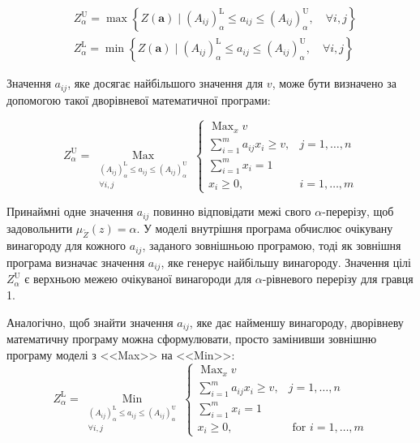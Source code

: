 \documentclass[14pt, a4paper, oneside]{extarticle}
\numberwithin{equation}{section}
\begin{document}
\begin{equation}
\begin{aligned}
& Z_{\alpha}^{\mathrm{U}}=\max \left\{Z(\mathbf{a}) \mid\left(A_{i j}\right)_{\alpha}^{\mathrm{L}} \leq a_{i j} \leq\left(A_{i j}\right)_{\alpha}^{\mathrm{U}}, \quad \forall i, j\right\} \\
& Z_{\alpha}^{\mathrm{L}}=\min \left\{Z(\mathbf{a}) \mid\left(A_{i j}\right)_{\alpha}^{\mathrm{L}} \leq a_{i j} \leq\left(A_{i j}\right)_{\alpha}^{\mathrm{U}}, \quad \forall i, j\right\}
\end{aligned}
\end{equation}

Значення $a_{i j}$, яке досягає найбільшого значення для $v$, може бути визначено за допомогою такої дворівневої математичної програми:

\begin{equation}
Z_{\alpha}^{\mathrm{U}}=\underset{\substack{\left(A_{i j}\right)_{\alpha}^{\mathrm{L}} \leq a_{i j} \leq\left(A_{i j}\right)_{\alpha}^{\mathrm{U}} \\ \forall i, j}}{\operatorname{Max}} \begin{cases}\operatorname{Max}_{x} v \\ \sum_{i=1}^{m} a_{i j} x_{i} \geq v, & j=1, \ldots, n \\ \sum_{i=1}^{m} x_{i}=1 \\ x_{i} \geq 0, & i=1, \ldots, m
\end{cases}
\end{equation}

Принаймні одне значення $a_{i j}$ повинно відповідати межі свого $\alpha$-перерізу, щоб задовольнити $\mu_{\tilde{Z}}(z)=\alpha$. У моделі внутрішня програма обчислює очікувану винагороду для кожного $a_{i j}$, заданого зовнішньою програмою, тоді як зовнішня програма визначає значення $a_{i j}$, яке генерує найбільшу винагороду. Значення цілі $Z_{\alpha}^{\mathrm{U}}$ є верхньою межею очікуваної винагороди для $\alpha$-рівневого перерізу для гравця 1.

Аналогічно, щоб знайти значення $a_{i j}$, яке дає найменшу винагороду, дворівневу математичну програму можна сформулювати, просто замінивши зовнішню програму моделі з <<Max>> на <<Min>>:
\begin{equation}
Z_{\alpha}^{\mathrm{L}}=\underset{\substack{\left(A_{i j}\right)_{\alpha}^{\mathrm{L}} \leq a_{i j} \leq\left(A_{i j}\right)_{\alpha}^{\mathrm{U}} \\
\forall i, j}}{\operatorname{Min}}\left\{\begin{array}{ll}
\operatorname{Max}_{x} v \\
\sum_{i=1}^{m} a_{i j} x_{i} \geq v, & j=1, \ldots, n \\
\sum_{i=1}^{m} x_{i}=1 \\
x_{i} \geq 0, & \text { for } i=1, \ldots, m
\end{array}\right.
\end{equation}
\end{document}
